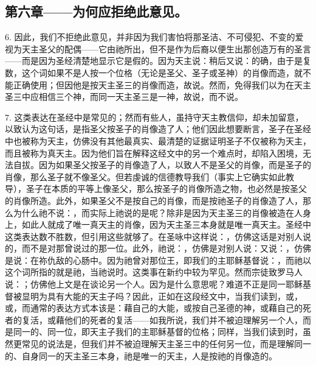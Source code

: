 
\subsection{第六章——为何应拒绝此意见。}

6. 因此，我们不拒绝此意见，并非因为我们害怕将那圣洁、不可侵犯、不变的爱视为天主圣父的配偶——它由祂所出，但不是作为后裔以便生出那创造万有的圣言——而是因为圣经清楚地显示它是假的。因为天主说：稍后又说：的确，由于是复数，这个词如果不是人按一个位格（无论是圣父、圣子或圣神）的肖像而造，就不能正确使用；但因他是按天主圣三的肖像而造，故说。然而，免得我们以为在天主圣三中应相信三个神，而同一天主圣三是一神，故说，而不说。\par

7. 这类表达在圣经中是常见的；然而有些人，虽持守天主教信仰，却未加留意，以致认为这句话，是指圣父按圣子的肖像造了人；他们因此想要断言，圣子在圣经中也被称为天主，仿佛没有其他最真实、最清楚的证据证明圣子不仅被称为天主，而且被称为真天主。因为他们旨在解释这经文中的另一个难点时，却陷入困境，无法自拔。因为如果圣父按圣子的肖像造了人，以致人不是圣父的肖像，而是圣子的肖像，那么圣子就不像圣父。但若虔诚的信德教导我们（事实上它确实如此教导），圣子在本质的平等上像圣父，那么按圣子的肖像所造之物，也必然是按圣父的肖像所造。此外，如果圣父不是按自己的肖像，而是按祂圣子的肖像造了人，那么为什么祂不说：，而实际上祂说的是呢？除非是因为天主圣三的肖像被造在人身上，如此人就成了唯一真天主的肖像，因为天主圣三本身就是唯一真天主。圣经中这类表达数不胜数，但引用这些就够了。在圣咏中这样说：，仿佛这话是对别人说的，而不是对那曾说过的那一位。此外，祂说：，仿佛是对别人说：又说：，仿佛是说：在祢仇敌的心肠中。因为祂曾对那位王，即我们的主耶稣基督说：，而祂以这个词所指的就是祂，当祂说时。这类事在新约中较为罕见。然而宗徒致罗马人说：；仿佛他上文是在谈论另一个人。因为是什么意思呢？难道不正是同一耶稣基督被显明为具有大能的天主子吗？因此，正如在这段经文中，当我们读到，或，或，而通常的表达方式本该是：藉自己的大能，或按自己圣德的神，或藉自己的死者的复活，或藉他们的死者的复活——如我所说，我们并不被迫理解另一个人，而是同一的、同一位，即天主子我们的主耶稣基督的位格；同样，当我们读到时，虽然更常见的说法是，但我们并不被迫理解天主圣三中的任何另一位，而是理解同一的、自身同一的天主圣三本身，祂是唯一的天主，人是按祂的肖像造的。\par

